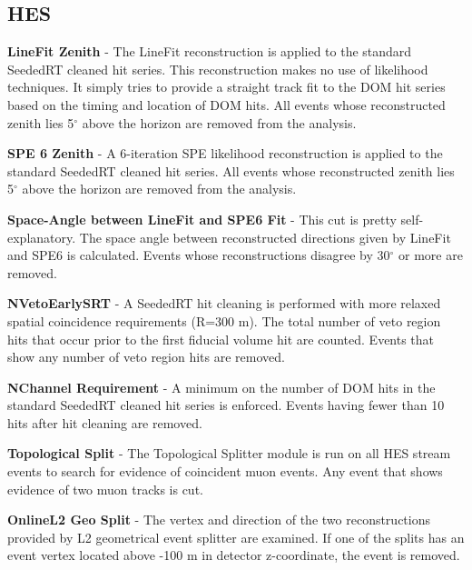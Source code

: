 \documentclass{gatech-thesis}
\begin{document}
\subsection{HES}
\begin{adjustwidth}{1.5em}{1.5em}
\setlength{\parindent}{0pt}
\textbf{LineFit Zenith} - The LineFit reconstruction is applied to the standard SeededRT cleaned hit series. This reconstruction makes no use of likelihood techniques. It simply tries to provide a straight track fit to the DOM hit series based on the timing and location of DOM hits. All events whose reconstructed zenith lies 5$^{\circ}$ above the horizon are removed from the analysis.

\textbf{SPE 6 Zenith} - A 6-iteration SPE likelihood reconstruction is applied to the standard SeededRT cleaned hit series. All events whose reconstructed zenith lies 5$^{\circ}$ above the horizon are removed from the analysis.

\textbf{Space-Angle between LineFit and SPE6 Fit} - This cut is pretty self-explanatory. The space angle between reconstructed directions given by LineFit and SPE6 is calculated. Events whose reconstructions disagree by 30$^{\circ}$ or more are removed.

\textbf{NVetoEarlySRT} - A SeededRT hit cleaning is performed with more relaxed spatial coincidence requirements (R=300 m). The total number of veto region hits that occur prior to the first fiducial volume hit are counted. Events that show any number of veto region hits are removed.

\textbf{NChannel Requirement} - A minimum on the number of DOM hits in the standard SeededRT cleaned hit series is enforced. Events having fewer than 10 hits after hit cleaning are removed.

\textbf{Topological Split} - The Topological Splitter module is run on all HES stream events to search for evidence of coincident muon events. Any event that shows evidence of two muon tracks is cut.

\textbf{OnlineL2 Geo Split} - The vertex and direction of the two reconstructions provided by L2 geometrical event splitter are examined. If one of the splits has an event vertex located above -100 m in detector z-coordinate, the event is removed.
\end{adjustwidth}
\setlength{\parindent}{17.5pt}
\end{document}
